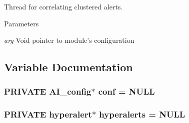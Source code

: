 Thread for correlating clustered alerts. 


\begin{DoxyParams}{Parameters}
\item[{\em arg}]Void pointer to module's configuration \end{DoxyParams}


\subsection{Variable Documentation}
\hypertarget{group__correlation_gaad7a982b6016390e7cd1164bd7db8bca}{
\subsubsection[{conf}]{\setlength{\rightskip}{0pt plus 5cm}PRIVATE {\bf AI\_\-config}$\ast$ {\bf conf} = NULL}}
\label{group__correlation_gaad7a982b6016390e7cd1164bd7db8bca}
\hypertarget{group__correlation_ga343192ed5e938536f3dc150e51f8acf6}{
\subsubsection[{hyperalerts}]{\setlength{\rightskip}{0pt plus 5cm}PRIVATE {\bf hyperalert}$\ast$ {\bf hyperalerts} = NULL}}
\label{group__correlation_ga343192ed5e938536f3dc150e51f8acf6}
